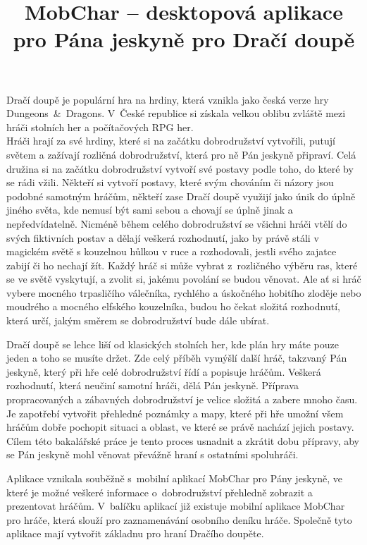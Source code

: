 \documentclass[thesis=B,czech]{resources/FITthesis}[2012/06/26]
\title{	MobChar -- desktopová aplikace pro Pána jeskyně pro Dračí doupě}
\begin{document}

\begin{introduction}
Dračí doupě je populární hra na hrdiny, která vznikla jako česká verze hry Dungeons~\&~Dragons. V~České republice si získala velkou oblibu zvláště mezi hráči stolních her a počítačových RPG her.\\

Hráči hrají za své hrdiny, které si na začátku dobrodružství vytvořili, putují světem a zažívají rozličná dobrodružství, která pro ně Pán jeskyně připraví. Celá družina si na začátku dobrodružství vytvoří své postavy podle toho, do které by se rádi vžili. Někteří si vytvoří postavy, které svým chováním či názory jsou podobné samotným hráčům, někteří zase Dračí doupě využijí jako únik do úplně jiného světa, kde nemusí být sami sebou a chovají se úplně jinak a nepředvídatelně. Nicméně během celého dobrodružství se všichni hráči vtělí do svých fiktivních postav a dělají veškerá rozhodnutí, jako by právě stáli v magickém světě s kouzelnou hůlkou v ruce a rozhodovali, jestli svého zajatce zabijí či ho nechají žít.
Každý hráč si může vybrat z~rozličného výběru ras, které se ve světě vyskytují, a zvolit si, jakému povolání se budou věnovat. Ale ať si hráč vybere mocného trpasličího válečníka, rychlého a úskočného hobitího zloděje nebo moudrého a mocného elfského kouzelníka, budou ho čekat složitá rozhodnutí, která určí, jakým směrem se dobrodružství bude dále ubírat. \par

Dračí doupě se lehce liší od klasických stolních her, kde plán hry máte pouze jeden a toho se musíte držet. Zde celý příběh vymýšlí další hráč, takzvaný Pán jeskyně, který při hře celé dobrodružství řídí a popisuje hráčům. Veškerá rozhodnutí, která neučiní samotní hráči, dělá Pán jeskyně. Příprava propracovaných a zábavných dobrodružství je velice složitá a zabere mnoho času. Je zapotřebí vytvořit přehledné poznámky a mapy, které při hře umožní všem hráčům dobře pochopit situaci a oblast, ve které se právě nachází jejich postavy. Cílem této bakalářské práce je tento proces usnadnit a zkrátit dobu přípravy, aby se Pán jeskyně mohl věnovat převážně hraní s ostatními spoluhráči. \par

Aplikace vznikala souběžně s~mobilní aplikací MobChar pro Pány jeskyně\cite{Shanel_2017}, ve které je možné veškeré informace o~dobrodružství přehledně zobrazit a prezentovat hráčům. V~balíčku aplikací již existuje mobilní aplikace MobChar pro hráče, která slouží pro zaznamenávání osobního deníku hráče\cite{Weberova_2017}. Společně tyto aplikace mají vytvořit základnu pro hraní Dračího doupěte. 


\end{introduction}
\end{document}
